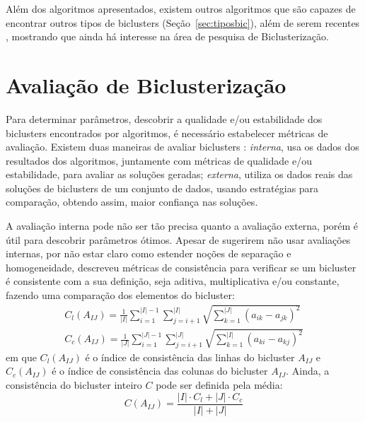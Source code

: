 \documentclass[
    12pt,                %
    oneside,            %
    a4paper,            %
    english,            %
    brazil                %
    ]{abntex2ppgsi}
\begin{document}


Além dos algoritmos apresentados, existem outros algoritmos que são capazes de encontrar outros tipos de biclusters (Seção~\ref{sec:tiposbic}), além de serem recentes \cite{Franca20102,Yang2013,Hochreiter2010,Cabanes2012}, mostrando que ainda há interesse na área de pesquisa de Biclusterização.

 \section{Avaliação de Biclusterização}

Para determinar parâmetros, descobrir a qualidade e/ou estabilidade dos biclusters encontrados por algoritmos, é necessário estabelecer métricas de avaliação. Existem duas maneiras de avaliar biclusters \cite{Hochreiter2010}: \textit{interna}, usa os dados dos resultados dos algoritmos, juntamente com métricas de qualidade e/ou estabilidade, para avaliar as soluções geradas; \textit{externa}, utiliza os dados reais das soluções de biclusters de um conjunto de dados, usando estratégias para comparação, obtendo assim, maior confiança nas soluções.

A avaliação interna pode não ser tão precisa quanto a avaliação externa, porém é útil para descobrir parâmetros ótimos. Apesar de  sugerirem não usar avaliações internas, por não estar claro como estender noções de separação e homogeneidade,  descreveu métricas de consistência para verificar se um bicluster é consistente com a sua definição, seja aditiva, multiplicativa e/ou constante, fazendo uma comparação dos elementos do bicluster:
\begin{equation}
\begin{split}
C_l(A_{IJ}) = \frac{1}{|I|} \displaystyle\sum_{i = 1}^{|I| - 1} \displaystyle\sum_{j = i + 1}^{|I|} \sqrt{ \displaystyle\sum_{k = 1}^{|J|} (a_{ik} - a_{jk})^2 } \\
C_c(A_{IJ}) = \frac{1}{|J|} \displaystyle\sum_{i = 1}^{|J| - 1} \displaystyle\sum_{j = i + 1}^{|J|} \sqrt{ \displaystyle\sum_{k = 1}^{|I|} (a_{ki} - a_{kj})^2 }    \nonumber
\end{split}
\end{equation}
em que $C_l(A_{IJ})$ é o índice de consistência das linhas do bicluster $A_{IJ}$ e $C_c(A_{IJ})$ é o índice de consistência das colunas do bicluster $A_{IJ}$. Ainda, a consistência do bicluster inteiro $C$ pode ser definida pela média:
\begin{equation}
C(A_{IJ}) = \frac{|I| \cdot C_l + |J| \cdot C_c}{|I| + |J|}   \nonumber
\end{equation}
\end{document}
